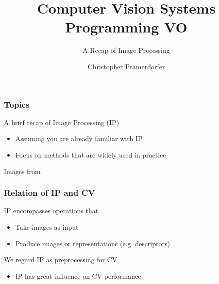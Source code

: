 \documentclass[xetex,professionalfont]{beamer}
\title{Computer Vision Systems Programming VO}
\subtitle{A Recap of Image Processing}
\author{Christopher Pramerdorfer}
\institute{Computer Vision Lab, Vienna University of Technology}
\newcommand{\eg}{\mbox{e.g.}\xspace} %
\begin{document}

\begin{frame}
\maketitle
\end{frame}


\begin{frame}
\frametitle{Topics}

A brief recap of Image Processing (IP)
\begin{itemize}
	\item Assuming you are already familiar with IP
	\item Focus on methods that are widely used in practice
\end{itemize}

\medskip
\begin{center}
	{\centering Images from \cite{prince12}}
\end{center}

\end{frame}


\begin{frame}
\frametitle{Relation of IP and CV}

IP encompasses operations that
\begin{itemize}
	\item Take images as input
	\item Produce images or representations (\eg descriptors)
\end{itemize}

\medskip
We regard IP as preprocessing for CV
\begin{itemize}
	\item IP has great influence on CV performance
\end{itemize}

\end{frame}
\end{document}
